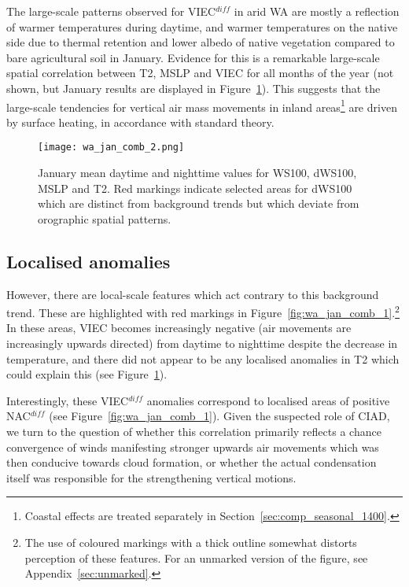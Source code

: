 The large-scale patterns observed for \ac{VIEC}$^{diff}$ in arid \ac{WA} are mostly a reflection of warmer temperatures during daytime, and warmer temperatures on the native side due to thermal retention and lower albedo of native vegetation compared to bare agricultural soil in January. Evidence for this is a remarkable large-scale spatial correlation between \ac{T2}, \ac{MSLP} and \ac{VIEC} for all months of the year (not shown, but January results are displayed in Figure~\ref{fig:wa_jan_comb_2}). This suggests that the large-scale tendencies for vertical air mass movements in inland areas\footnote{Coastal effects are treated separately in Section~\ref{sec:comp_seasonal_1400}.} are driven by surface heating, in accordance with standard theory.

\begin{figure}[!ht]
	\centering
	\texttt{[image: wa\_jan\_comb\_2.png]}
	\caption[January means for selected variables 2]{January mean daytime and nighttime values for \acs{WS100}, \acs{dWS100}, \acs{MSLP} and \acs{T2}. Red markings indicate selected areas for \acs{dWS100} which are distinct from background trends but which deviate from orographic spatial patterns.}
	\label{fig:wa_jan_comb_2}
\end{figure}

\subsection{Localised anomalies}

However, there are local-scale features which act contrary to this background trend. These are highlighted with red markings in Figure~\ref{fig:wa_jan_comb_1}.\footnote{The use of coloured markings with a thick outline somewhat distorts perception of these features. For an unmarked version of the figure, see Appendix~\ref{sec:unmarked}.} In these areas, \ac{VIEC} becomes increasingly negative (air movements are increasingly upwards directed) from daytime to nighttime despite the decrease in temperature, and there did not appear to be any localised anomalies in \ac{T2} which could explain this (see Figure~\ref{fig:wa_jan_comb_2}).

Interestingly, these \ac{VIEC}$^{diff}$ anomalies correspond to localised areas of positive \ac{NAC}$^{diff}$ (see Figure~\ref{fig:wa_jan_comb_1}). Given the suspected role of \ac{CIAD}, we turn to the question of whether this correlation primarily reflects a chance convergence of winds manifesting stronger upwards air movements which was then conducive towards cloud formation, or whether the actual condensation itself was responsible for the strengthening vertical motions.

